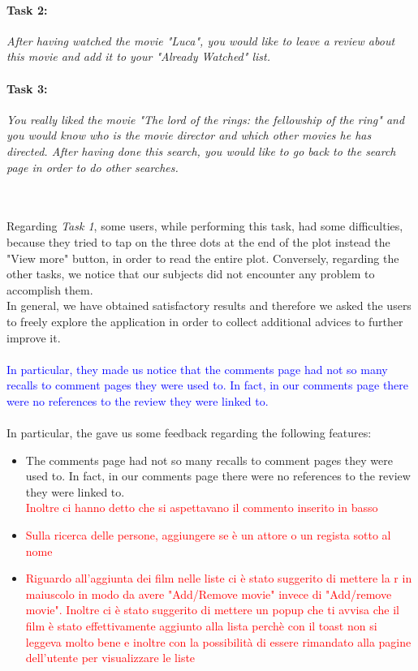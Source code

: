 \documentclass[12pt, a4paper]{article}
\numberwithin{figure}{section}
\begin{document}
\paragraph{Task 2:} \textit{After having watched the movie "Luca", you would like to leave a review about this movie and 
add it to your "Already Watched" list.}

\paragraph{Task 3:} \textit{You really liked the movie "The lord of the rings: the fellowship of the ring" and you would know
who is the movie director and which other movies he has directed. After having done this search, you would like to go back
to the search page in order to do other searches.}

\mbox{}\\\\
Regarding \textit{Task 1}, some users, while performing this task, had some difficulties, because they tried to tap on 
the three dots at the end of the plot instead the "View more" button, in order to read the entire plot.
Conversely, regarding the other tasks, we notice that our subjects did not encounter any problem to accomplish them.\\
In general, we have obtained satisfactory results and therefore we asked the users to freely explore the application in order 
to collect additional advices to further improve it.\\\\
\textcolor{blue}{In particular, they made us notice that the comments page had not so many recalls to comment pages they were used to. 
In fact, in our comments page there were no references to the review they were linked to.}\\\\
In particular, the gave us some feedback regarding the following features:
\begin{itemize}
	\item {The comments page had not so many recalls to comment pages they were used to. 
	In fact, in our comments page there were no references to the review they were linked to.\\
	\textcolor{red}{Inoltre ci hanno detto che si aspettavano il commento inserito in basso}}
	\item {\textcolor{red}{Sulla ricerca delle persone, aggiungere se è un attore o un regista sotto al nome}}
	\item {\textcolor{red}{Riguardo all'aggiunta dei film nelle liste ci è stato suggerito di mettere 
	la r in maiuscolo in modo da avere "Add/Remove movie" invece di "Add/remove movie". Inoltre ci è
	stato suggerito di mettere un popup che ti avvisa che il film è stato effettivamente aggiunto alla lista
	perchè con il toast non si leggeva molto bene e inoltre con la possibilità di essere rimandato alla
	pagine dell'utente per visualizzare le liste}}
\end{itemize}
\end{document}
